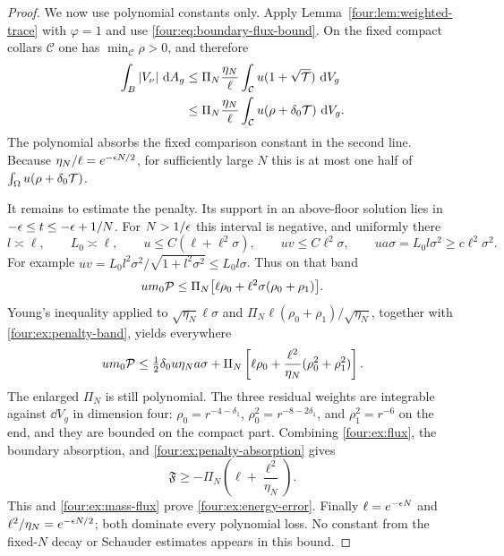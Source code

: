 \begin{proof}
We now use polynomial constants only.  Apply
Lemma~\ref{four:lem:weighted-trace} with $\varphi=1$ and use
\eqref{four:eq:boundary-flux-bound}.  On the fixed compact collars
$\mathcal C$ one has $\min_{\mathcal C}\rho>0$, and therefore
\[
 \begin{split}
 \int_B|V_\nu|\,\,\mathrm d A_g
 &\le\Pi_N\frac{\eta_N}{\ell}
       \int_{\mathcal C}u(1+\sqrt{\mathcal T})\,\,\mathrm d V_g\\
 &\le\Pi_N\frac{\eta_N}{\ell}
       \int_{\mathcal C}u(\rho+\delta_0\mathcal T)\,\,\mathrm d V_g.
 \end{split}
\]
The polynomial absorbs the fixed comparison constant in the second
line.  Because $\eta_N/\ell=e^{-\epsilon N/2}$, for sufficiently large
$N$ this is at most one half of
$\int_\Omega u(\rho+\delta_0\mathcal T)$.

It remains to estimate the penalty.  Its support in an above-floor
solution lies in
$-\epsilon\le t\le-\epsilon+1/N$.  For $N>1/\epsilon$ this interval is negative,
and uniformly there
\begin{equation}\label{four:ex:penalty-band}
 l\asymp\ell,\qquad L_0\asymp\ell,\qquad
 u\le C(\ell+\ell^2\sigma),\qquad
 uv\le C\ell^2\sigma,\qquad
 ua\sigma=L_0l\sigma^2\ge c\ell^2\sigma^2.
\end{equation}
For example $uv=L_0l^2\sigma^2/\sqrt{1+l^2\sigma^2}
\le L_0l\sigma$.  Thus on that band
\[
 um_0\mathcal P\le\Pi_N\bigl[\ell\rho_0+
                         \ell^2\sigma(\rho_0+\rho_1)\bigr].
\]
Young's inequality applied to
$\sqrt{\eta_N}\ell\sigma$ and
$\Pi_N\ell(\rho_0+\rho_1)/\sqrt{\eta_N}$, together with
\eqref{four:ex:penalty-band}, yields everywhere
\begin{equation}\label{four:ex:penalty-absorption}
 um_0\mathcal P\le\tfrac12\delta_0u\eta_N a\sigma
   +\Pi_N\left[\ell\rho_0+
       \frac{\ell^2}{\eta_N}(\rho_0^2+\rho_1^2)\right].
\end{equation}
The enlarged $\Pi_N$ is still polynomial.  The three residual weights
are integrable against $\dd V_g$ in dimension four:
$\rho_0=r^{-4-\delta_1}$, $\rho_0^2=r^{-8-2\delta_1}$, and
$\rho_1^2=r^{-6}$ on the end, and they are bounded on the compact part.
Combining \eqref{four:ex:flux}, the boundary absorption, and
\eqref{four:ex:penalty-absorption} gives
\[
 \mathfrak F\ge-\Pi_N\left(\ell+\frac{\ell^2}{\eta_N}\right).
\]
This and \eqref{four:ex:mass-flux} prove \eqref{four:ex:energy-error}.
Finally $\ell=e^{-\epsilon N}$ and $\ell^2/\eta_N=e^{-\epsilon N/2}$;
both dominate every polynomial loss.  No constant from the fixed-$N$
decay or Schauder estimates appears in this bound.
\end{proof}



